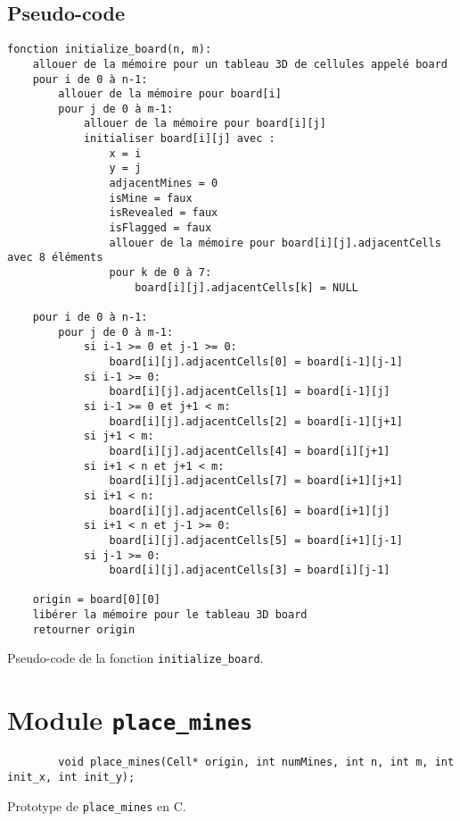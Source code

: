 \subsection{Pseudo-code}
\begin{longlisting}
    \begin{verbatim}
fonction initialize_board(n, m):
    allouer de la mémoire pour un tableau 3D de cellules appelé board
    pour i de 0 à n-1:
        allouer de la mémoire pour board[i]
        pour j de 0 à m-1:
            allouer de la mémoire pour board[i][j]
            initialiser board[i][j] avec :
                x = i
                y = j
                adjacentMines = 0
                isMine = faux
                isRevealed = faux
                isFlagged = faux
                allouer de la mémoire pour board[i][j].adjacentCells avec 8 éléments
                pour k de 0 à 7:
                    board[i][j].adjacentCells[k] = NULL

    pour i de 0 à n-1:
        pour j de 0 à m-1:
            si i-1 >= 0 et j-1 >= 0:
                board[i][j].adjacentCells[0] = board[i-1][j-1]
            si i-1 >= 0:
                board[i][j].adjacentCells[1] = board[i-1][j]
            si i-1 >= 0 et j+1 < m:
                board[i][j].adjacentCells[2] = board[i-1][j+1]
            si j+1 < m:
                board[i][j].adjacentCells[4] = board[i][j+1]
            si i+1 < n et j+1 < m:
                board[i][j].adjacentCells[7] = board[i+1][j+1]
            si i+1 < n:
                board[i][j].adjacentCells[6] = board[i+1][j]
            si i+1 < n et j-1 >= 0:
                board[i][j].adjacentCells[5] = board[i+1][j-1]
            si j-1 >= 0:
                board[i][j].adjacentCells[3] = board[i][j-1]

    origin = board[0][0]
    libérer la mémoire pour le tableau 3D board
    retourner origin
    \end{verbatim}
    \caption{Pseudo-code de la fonction \texttt{initialize\_board}.}
\end{longlisting}

\newpage

\section{Module \texttt{place\_mines}}

\begin{listing}[!htpb]
    \begin{verbatim}
        void place_mines(Cell* origin, int numMines, int n, int m, int init_x, int init_y);
    \end{verbatim}
    \caption{Prototype de \texttt{place\_mines} en C.}
    \label{listing:c-place_mines-prototype}
\end{listing}

